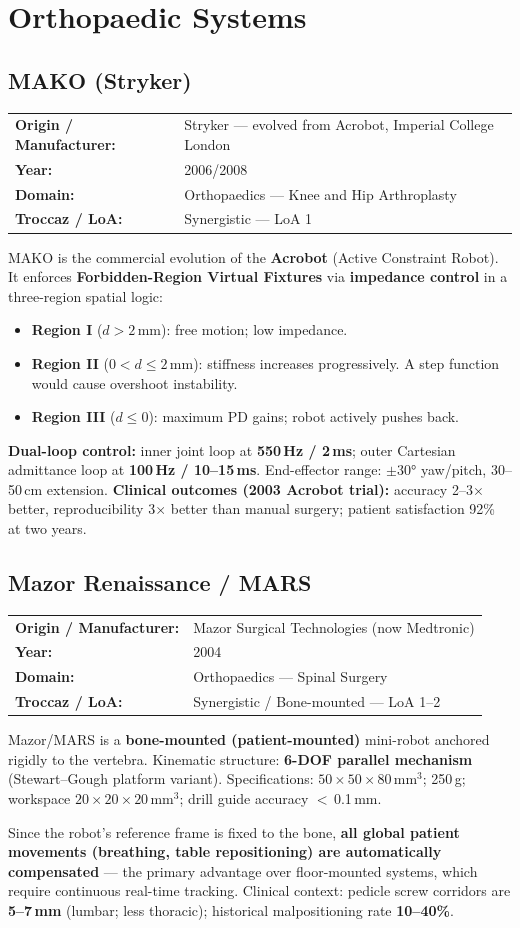 \documentclass[11pt,a4paper,twoside]{report}
\makeatletter
\newcommand{\robotmeta}[4]{%
  \noindent\begin{tabular}{@{}ll@{}}
    \textbf{Origin / Manufacturer:} & #1 \\
    \textbf{Year:}                  & #2 \\
    \textbf{Domain:}                & #3 \\
    \textbf{Troccaz / LoA:}         & #4 \\
  \end{tabular}\par\smallskip\noindent}
\makeatother
\begin{document}
\chapter{Orthopaedic Systems}

\section{MAKO (Stryker)}
\robotmeta{Stryker — evolved from Acrobot, Imperial College London}{2006/2008}{Orthopaedics — Knee and Hip Arthroplasty}{Synergistic — LoA 1}
MAKO is the commercial evolution of the \textbf{Acrobot} (Active Constraint Robot). It enforces \textbf{Forbidden-Region Virtual Fixtures} via \textbf{impedance control} in a three-region spatial logic:
\begin{itemize}
  \item \textbf{Region I} ($d > 2$\,mm): free motion; low impedance.
  \item \textbf{Region II} ($0 < d \leq 2$\,mm): stiffness increases progressively. A step function would cause overshoot instability.
  \item \textbf{Region III} ($d \leq 0$): maximum PD gains; robot actively pushes back.
\end{itemize}
\textbf{Dual-loop control:} inner joint loop at \textbf{550\,Hz / 2\,ms}; outer Cartesian admittance loop at \textbf{100\,Hz / 10--15\,ms}. End-effector range: $\pm 30°$ yaw/pitch, 30--50\,cm extension. \textbf{Clinical outcomes (2003 Acrobot trial):} accuracy 2--3$\times$ better, reproducibility 3$\times$ better than manual surgery; patient satisfaction 92\% at two years.

\section{Mazor Renaissance / MARS}
\robotmeta{Mazor Surgical Technologies (now Medtronic)}{2004}{Orthopaedics — Spinal Surgery}{Synergistic / Bone-mounted — LoA 1--2}
Mazor/MARS is a \textbf{bone-mounted (patient-mounted)} mini-robot anchored rigidly to the vertebra. Kinematic structure: \textbf{6-DOF parallel mechanism} (Stewart--Gough platform variant). Specifications: $50\times50\times80$\,mm$^3$; 250\,g; workspace $20\times20\times20$\,mm$^3$; drill guide accuracy $<$\,0.1\,mm.

Since the robot's reference frame is fixed to the bone, \textbf{all global patient movements (breathing, table repositioning) are automatically compensated} — the primary advantage over floor-mounted systems, which require continuous real-time tracking. Clinical context: pedicle screw corridors are \textbf{5--7\,mm} (lumbar; less thoracic); historical malpositioning rate \textbf{10--40\%}.
\end{document}
